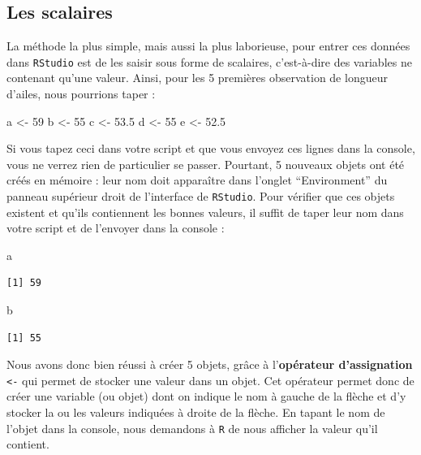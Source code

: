 \documentclass[
  a4paper,
  DIV=11,
  numbers=noendperiod,
  oneside]{scrreprt}
\newenvironment{Shaded}{}{}
\newcommand{\DecValTok}[1]{\textcolor[rgb]{0.00,0.36,0.77}{#1}}
\newcommand{\FloatTok}[1]{\textcolor[rgb]{0.00,0.36,0.77}{#1}}
\newcommand{\NormalTok}[1]{\textcolor[rgb]{0.14,0.16,0.18}{#1}}
\newcommand{\OtherTok}[1]{\textcolor[rgb]{0.44,0.26,0.76}{#1}}
\begin{document}
\subsection{Les scalaires}\label{sec-scalaires}

La méthode la plus simple, mais aussi la plus laborieuse, pour entrer
ces données dans \texttt{RStudio} est de les saisir sous forme de
scalaires, c'est-à-dire des variables ne contenant qu'une valeur. Ainsi,
pour les 5 premières observation de longueur d'ailes, nous pourrions
taper :

\begin{Shaded}
\begin{Highlighting}[]
\NormalTok{a }\OtherTok{\textless{}{-}} \DecValTok{59}
\NormalTok{b }\OtherTok{\textless{}{-}} \DecValTok{55}
\NormalTok{c }\OtherTok{\textless{}{-}} \FloatTok{53.5}
\NormalTok{d }\OtherTok{\textless{}{-}} \DecValTok{55}
\NormalTok{e }\OtherTok{\textless{}{-}} \FloatTok{52.5}
\end{Highlighting}
\end{Shaded}

Si vous tapez ceci dans votre script et que vous envoyez ces lignes dans
la console, vous ne verrez rien de particulier se passer. Pourtant, 5
nouveaux objets ont été créés en mémoire : leur nom doit apparaître dans
l'onglet ``Environment'' du panneau supérieur droit de l'interface de
\texttt{RStudio}. Pour vérifier que ces objets existent et qu'ils
contiennent les bonnes valeurs, il suffit de taper leur nom dans votre
script et de l'envoyer dans la console :

\begin{Shaded}
\begin{Highlighting}[]
\NormalTok{a}
\end{Highlighting}
\end{Shaded}

\begin{verbatim}
[1] 59
\end{verbatim}

\begin{Shaded}
\begin{Highlighting}[]
\NormalTok{b}
\end{Highlighting}
\end{Shaded}

\begin{verbatim}
[1] 55
\end{verbatim}

Nous avons donc bien réussi à créer 5 objets, grâce à
l'\textbf{opérateur d'assignation} \texttt{\textless{}-} qui permet de
stocker une valeur dans un objet. Cet opérateur permet donc de créer une
variable (ou objet) dont on indique le nom à gauche de la flèche et d'y
stocker la ou les valeurs indiquées à droite de la flèche. En tapant le
nom de l'objet dans la console, nous demandons à \texttt{R} de nous
afficher la valeur qu'il contient.
\end{document}
